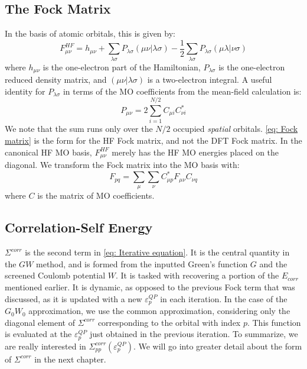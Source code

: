 \documentclass[12pt]{caltech_thesis}
\begin{document}
\subsection{The Fock Matrix}
In the basis of atomic orbitals, this is given by:
\begin{equation}
F_{\mu\nu}^{HF} = h_{\mu\nu} + \sum_{\lambda\sigma}P_{\lambda\sigma}(\mu\nu|\lambda\sigma) - \frac{1}{2}\sum_{\lambda\sigma}P_{\lambda\sigma}(\mu\lambda|\nu\sigma)
\label{eq: Fock matrix}
\end{equation}
where $h_{\mu\nu}$ is the one-electron part of the Hamiltonian, $P_{\lambda\sigma}$ is the one-electron reduced density matrix, and $(\mu\nu|\lambda\sigma)$ is a two-electron integral. \autocite{szabo_modern_2012} A useful identity for $P_{\lambda\sigma}$ in terms of the MO coefficients from the mean-field calculation is: 
\begin{equation}
P_{\mu\nu} = 2\sum_{i=1}^{N/2}C_{\mu i}C_{\nu i}^{*}
\end{equation}
We note that the sum runs only over the $N/2$ occupied \emph{spatial} orbitals. \ref{eq: Fock matrix} is the form for the HF Fock matrix, and not the DFT Fock matrix. In the canonical HF MO basis, $F_{\mu\nu}^{HF}$ merely has the HF MO energies placed on the diagonal. We transform the Fock matrix into the MO basis with:
\begin{equation}
   F_{pq} = \sum_{\mu} \sum_{\nu} C_{\mu p}^{*}F_{\mu\nu}C_{\nu q}
\end{equation}
where $C$ is the matrix of MO coefficients.
\subsection{Correlation-Self Energy}
$\Sigma^{corr}$ is the second term in \ref{eq: Iterative equation}. It is the central quantity in the $GW$ method, and is formed from the inputted Green's function $G$ and the screened Coulomb potential $W$. It is tasked with recovering a portion of the $E_{corr}$ mentioned earlier. It is dynamic, as opposed to the previous Fock term that was discussed, as it is updated with a new $\varepsilon_{p}^{QP}$ in each iteration. In the case of the $G_0W_0$ approximation, we use the common approximation, considering only the diagonal element of $\Sigma^{corr}$ corresponding to the orbital with index $p$. This function is evaluated at the $\varepsilon_{p}^{QP}$ just obtained in the previous iteration. To summarize, we are really interested in $\Sigma_{pp}^{corr}(\varepsilon_{p}^{QP})$. We will go into greater detail about the form of $\Sigma^{corr}$ in the next chapter.
\end{document}
